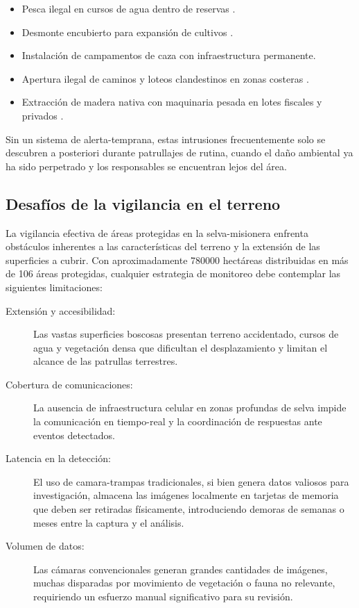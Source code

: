 \documentclass[a4paper, 12pt]{report}
\begin{document}
\begin{itemize}
  \item Pesca ilegal en cursos de agua dentro de reservas \cite{escobar2025politica}.
  \item Desmonte encubierto para expansión de cultivos \cite{escobar2025politica}.
  \item Instalación de campamentos de caza con infraestructura permanente.
  \item Apertura ilegal de caminos y loteos clandestinos en zonas costeras \cite{ecologiamisiones2026control}.
  \item Extracción de madera nativa con maquinaria pesada en lotes fiscales y privados \cite{ecologiamisiones2026control}.
\end{itemize}

Sin un sistema de \gls{alerta-temprana}, estas intrusiones frecuentemente solo se
descubren a posteriori durante patrullajes de rutina, cuando el daño ambiental
ya ha sido perpetrado y los responsables se encuentran lejos del área.

\subsection{Desafíos de la vigilancia en el terreno}

La vigilancia efectiva de áreas protegidas en la \gls{selva-misionera} enfrenta
obstáculos inherentes a las características del terreno y la extensión de las
superficies a cubrir. Con aproximadamente \num{780000} hectáreas distribuidas en
más de \num{106} áreas protegidas, cualquier estrategia de monitoreo debe contemplar
las siguientes limitaciones:

\begin{description}
  \item[Extensión y accesibilidad:] Las vastas superficies boscosas presentan
    terreno accidentado, cursos de agua y vegetación densa que dificultan
    el desplazamiento y limitan el alcance de las patrullas terrestres.
  \item[Cobertura de comunicaciones:] La ausencia de infraestructura celular
    en zonas profundas de selva impide la comunicación en \gls{tiempo-real}
    y la coordinación de respuestas ante eventos detectados.
  \item[Latencia en la detección:] El uso de \glspl{camara-trampa} tradicionales,
    si bien genera datos valiosos para investigación, almacena las imágenes
    localmente en tarjetas de memoria que deben ser retiradas físicamente,
    introduciendo demoras de semanas o meses entre la captura y el análisis.
  \item[Volumen de datos:] Las cámaras convencionales generan grandes cantidades
    de imágenes, muchas disparadas por movimiento de vegetación o fauna no
    relevante, requiriendo un esfuerzo manual significativo para su revisión.
\end{description}
\end{document}
